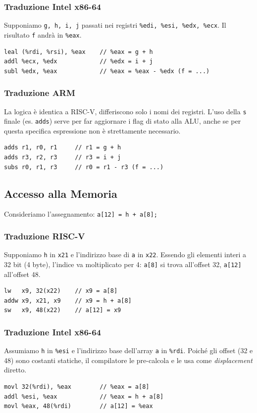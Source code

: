 \documentclass[12pt, a4paper]{article}
\begin{document}
\subsubsection{Traduzione Intel x86-64}
Supponiamo \texttt{g, h, i, j} passati nei registri \texttt{\%edi, \%esi, \%edx, \%ecx}. Il risultato \texttt{f} andrà in \texttt{\%eax}.
\begin{verbatim}
leal (%rdi, %rsi), %eax    // %eax = g + h
addl %ecx, %edx            // %edx = i + j
subl %edx, %eax            // %eax = %eax - %edx (f = ...)
\end{verbatim}

\subsubsection{Traduzione ARM}
La logica è identica a RISC-V, differiscono solo i nomi dei registri. L'uso della \texttt{s} finale (es. \texttt{adds}) serve per far aggiornare i flag di stato alla ALU, anche se per questa specifica espressione non è strettamente necessario.
\begin{verbatim}
adds r1, r0, r1     // r1 = g + h
adds r3, r2, r3     // r3 = i + j
subs r0, r1, r3     // r0 = r1 - r3 (f = ...)
\end{verbatim}

\subsection{Accesso alla Memoria}
Consideriamo l'assegnamento: \texttt{a[12] = h + a[8];}

\subsubsection{Traduzione RISC-V}
Supponiamo \texttt{h} in \texttt{x21} e l'indirizzo base di \texttt{a} in \texttt{x22}. Essendo gli elementi interi a 32 bit (4 byte), l'indice va moltiplicato per 4: \texttt{a[8]} si trova all'offset 32, \texttt{a[12]} all'offset 48.
\begin{verbatim}
lw   x9, 32(x22)    // x9 = a[8]
addw x9, x21, x9    // x9 = h + a[8]
sw   x9, 48(x22)    // a[12] = x9
\end{verbatim}

\subsubsection{Traduzione Intel x86-64}
Assumiamo \texttt{h} in \texttt{\%esi} e l'indirizzo base dell'array \texttt{a} in \texttt{\%rdi}. Poiché gli offset (32 e 48) sono costanti statiche, il compilatore le pre-calcola e le usa come \textit{displacement} diretto.
\begin{verbatim}
movl 32(%rdi), %eax        // %eax = a[8]
addl %esi, %eax            // %eax = h + a[8]
movl %eax, 48(%rdi)        // a[12] = %eax
\end{verbatim}
\end{document}
